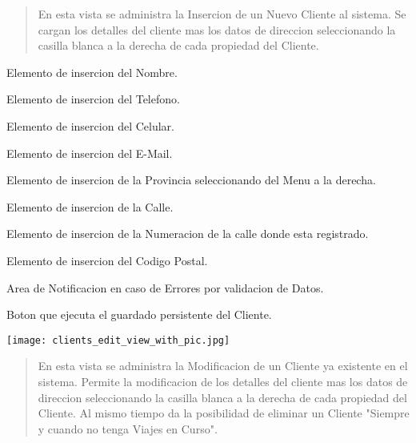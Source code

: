 \documentclass[
10pt, %
a4paper, %
oneside, %
headinclude,footinclude, %
BCOR5mm, %
]{scrartcl}
\begin{document}
 \begin{quotation}
    En esta vista se administra la Insercion de un Nuevo Cliente al sistema.
    Se cargan los detalles del cliente mas los datos de direccion seleccionando
    la casilla blanca a la derecha de cada propiedad del Cliente.
 \end{quotation}

 \begin{enumerated}
   \item  Elemento de insercion del Nombre.
   \item  Elemento de insercion del Telefono.
   \item  Elemento de insercion del Celular.
   \item  Elemento de insercion del E-Mail.
   \item  Elemento de insercion de la Provincia seleccionando
      del Menu a la derecha.
   \item  Elemento de insercion de la Calle.
   \item  Elemento de insercion de la Numeracion de la calle donde esta registrado.
   \item  Elemento de insercion del Codigo Postal.
   \item  Area de Notificacion en caso de Errores por validacion de Datos.
   \item  Boton que ejecuta el guardado persistente del Cliente.
  \end{enumerated}

\pagebreak

 \begin{flushleft}
     \texttt{[image: clients\_edit\_view\_with\_pic.jpg]}
 \end{flushleft}

 \begin{quotation}
    En esta vista se administra la Modificacion de un Cliente ya existente
    en el sistema. Permite la modificacion de los detalles del cliente mas los
    datos de direccion seleccionando la casilla blanca a la derecha de cada
    propiedad del Cliente.
    Al mismo tiempo da la posibilidad de eliminar un Cliente "Siempre y cuando
    no tenga Viajes en Curso".
 \end{quotation}
\end{document}
